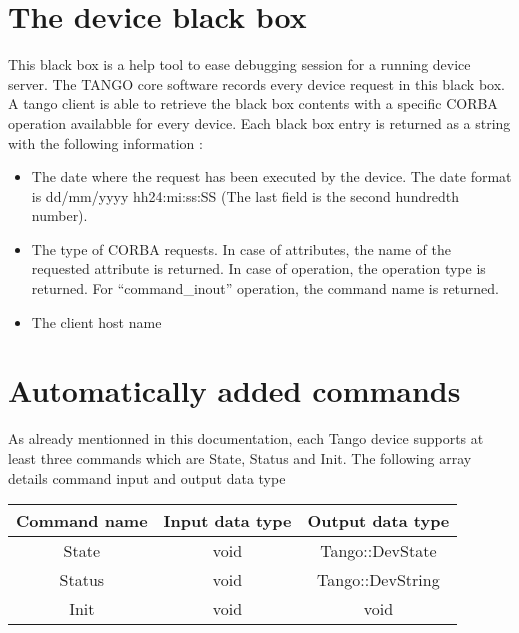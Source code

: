 \section{The device black box}

This black box is a help tool to ease debugging
session for a running device server. The TANGO core software records
every device request in this black box. A tango client is able to
retrieve the black box contents with a specific CORBA
operation availabble for every device. Each black box entry is returned
as a string with the following information :
\begin{itemize}
\item The date where the request has been executed by the device. The date
format is dd/mm/yyyy hh24:mi:ss:SS (The last field is the second hundredth
number).
\item The type of CORBA requests. In case of attributes, the name of the
requested attribute is returned. In case of operation, the operation
type is returned. For ``command\_inout'' operation, the command
name is returned.
\item The client host name
\end{itemize}

\section{Automatically added commands}

As already mentionned in this documentation, each Tango device supports
at least three commands which are State, Status
and Init. The following array details command input and
output data type

\vspace{0.3cm}


\begin{center}
\begin{longtable}{|c|c|c|}
\hline 
Command name & Input data type & Output data type\tabularnewline
\hline 
\hline 
State & void & Tango::DevState\tabularnewline
\hline 
Status & void & Tango::DevString\tabularnewline
\hline 
Init & void & void\tabularnewline
\hline 
\end{longtable}
\par\end{center}

\vspace{0.3cm}



